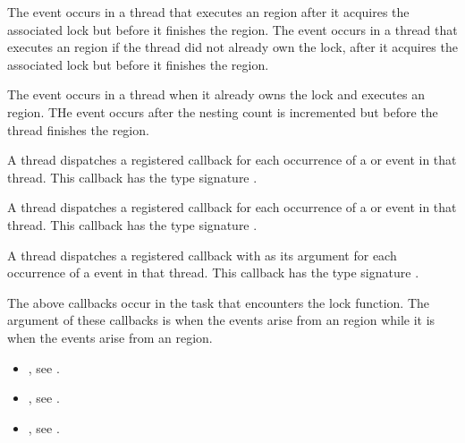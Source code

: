 The  event occurs in a thread that executes an 
 region after it acquires the associated lock but 
before it finishes the region. The  event occurs 
in a thread that executes an  region if the 
thread did not already own the lock, after it acquires the associated 
lock but before it finishes the region.

The  event occurs in a thread when it already owns the 
lock and executes an  region. THe event occurs after 
the nesting count is incremented but before the thread finishes the region.

\tools
A thread dispatches a registered 
callback for each occurrence of a  or  
event in that thread.  This callback has the type signature 
.

A thread dispatches a registered 
callback for each occurrence of a  or  
event in that thread.  This callback has the type signature 
.

A thread dispatches a registered 
callback with  as its  argument
for each occurrence of a  event in that thread. 
This callback has the type signature .

The above callbacks occur in the task that encounters the lock function.  
The  argument of these callbacks is  when
the events arise from an  region while it is 
  when the events arise from an 
 region.

\crossreferences
\begin{itemize}
\item {}, see
.

\item {}, see
.

\item {}, see
.
\end{itemize}



